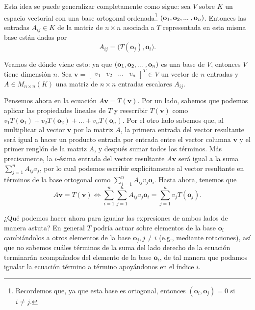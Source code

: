 \documentclass[12pt]{article}
\begin{document}
Esta idea se puede generalizar completamente como sigue: sea $V$ sobre $K$ un espacio vectorial con una base ortogonal ordenada\footnote{Recordemos que, ya que esta base es ortogonal, entonces $(\mathbf{o}_i,\mathbf{o}_j)=0$ si $i\neq j$.} $(\mathbf{o}_1,\mathbf{o}_2,...\hspace{1mm},\mathbf{o}_n)$. Entonces las entradas $A_{ij}\in K$ de la matriz de $n\times n$ asociada a $T$ representada en esta misma base están dadas por \[A_{ij}=\big(T(\mathbf{o}_j),\mathbf{o}_i\big).\]

Veamos de dónde viene esto: ya que $(\mathbf{o}_1,\mathbf{o}_2,...\hspace{1mm},\mathbf{o}_n)$ es una base de $V$, entonces $V$ tiene dimensión $n$. Sea $\mathbf{v}=\begin{bmatrix} v_1&v_2&...&v_n \end{bmatrix}^T \in V$ un vector de $n$ entradas y $A\in M_{n\times n}(K)$ una matriz de $n\times n$ entradas escalares $A_{ij}$.

Pensemos ahora en la ecuación $A\mathbf{v}=T(\mathbf{v}).$ Por un lado, sabemos que podemos aplicar las propiedades lineales de $T$ y reescribir $T(\mathbf{v})$ como $v_1T(\mathbf{o}_1)+v_2T(\mathbf{o}_2)+...+v_nT(\mathbf{o}_n).$ Por el otro lado sabemos que, al multiplicar al vector $\mathbf{v}$ por la matriz $A$, la primera entrada del vector resultante será igual a hacer un producto entrada por entrada entre el vector columna $\mathbf{v}$ y el primer renglón de la matriz $A$, y después sumar todos los términos. Más precisamente, la $i$-ésima entrada del vector resultante $A\mathbf{v}$ será igual a la suma $\sum_{j=1}^n A_{ij} v_j$, por lo cual podemos escribir explícitamente al vector resultante en términos de la base ortogonal como $\sum_{j=1}^n A_{ij} v_j \mathbf{o}_i$. Hasta ahora, tenemos que \[
    A\mathbf{v}=T(\mathbf{v}) \iff \sum_{i=1}^n \sum_{j=1}^n A_{ij} v_j \mathbf{o}_i = \sum_{j=1}^n v_j T(\mathbf{o}_j) 
.\] 

¿Qué podemos hacer ahora para igualar las expresiones de ambos lados de manera astuta? En general $T$ podría actuar sobre elementos de la base $\mathbf{o}_i$ cambiándolos a otros elementos de la base $\mathbf{o}_j, j\neq i$ (e.g., mediante rotaciones), así que no sabemos cuáles términos de la suma del lado derecho de la ecuación terminarán acompañados del elemento de la base $\mathbf{o}_i$, de tal manera que podamos igualar la ecuación término a término apoyándonos en el índice $i$. 
\end{document}

